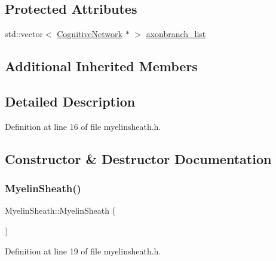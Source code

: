 \subsection*{Protected Attributes}
\begin{DoxyCompactItemize}
\item 
std\+::vector$<$ \mbox{\hyperlink{class_cognitive_network}{Cognitive\+Network}} $\ast$ $>$ \mbox{\hyperlink{class_myelin_sheath_a7877f5feab5bae37903653bf89dc3d5b}{axonbranch\+\_\+list}}
\end{DoxyCompactItemize}
\subsection*{Additional Inherited Members}


\subsection{Detailed Description}


Definition at line 16 of file myelinsheath.\+h.



\subsection{Constructor \& Destructor Documentation}
\mbox{\label{class_myelin_sheath_a298d69acb8d64de018f32443ea015287}} 
\subsubsection{\texorpdfstring{Myelin\+Sheath()}{MyelinSheath()}\hspace{0.1cm}{\footnotesize\ttfamily [1/4]}}
{\footnotesize\ttfamily Myelin\+Sheath\+::\+Myelin\+Sheath (\begin{DoxyParamCaption}{ }\end{DoxyParamCaption})\hspace{0.3cm}{\ttfamily [inline]}}



Definition at line 19 of file myelinsheath.\+h.

\mbox{\label{class_myelin_sheath_a9f9f90c853f341b5cbf4f2c5035a14af}} 
